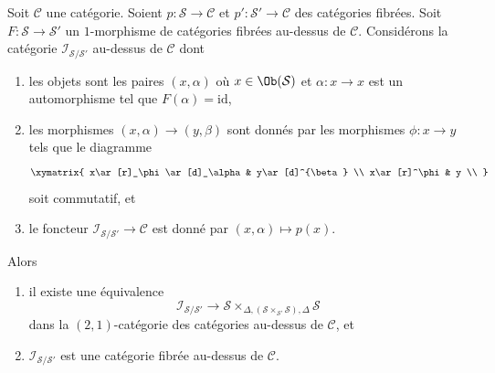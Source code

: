 \begin{lemma}
\label{lemma-inertia-fibred-category}
Soit $\mathcal{C}$ une catégorie. Soient
$p : \mathcal{S} \to \mathcal{C}$ et
$p' : \mathcal{S}' \to \mathcal{C}$ des catégories fibrées.
Soit $F : \mathcal{S} \to \mathcal{S}'$ un $1$-morphisme de
catégories fibrées au-dessus de $\mathcal{C}$. Considérons la catégorie
$\mathcal{I}_{\mathcal{S}/\mathcal{S}'}$ au-dessus de $\mathcal{C}$ dont
\begin{enumerate}
\item les objets sont les paires $(x, \alpha)$ où $x \in \Ob(\mathcal{S})$
et $\alpha : x \to x$ est un automorphisme tel que $F(\alpha) = \text{id}$,
\item les morphismes $(x, \alpha) \to (y, \beta)$ sont donnés par les morphismes
$\phi : x \to y$ tels que le diagramme
$$
\xymatrix{
x\ar[r]_\phi\ar[d]_\alpha &
y\ar[d]^{\beta} \\
x\ar[r]^\phi &
y \\
}
$$
soit commutatif, et
\item le foncteur $\mathcal{I}_{\mathcal{S}/\mathcal{S}'} \to \mathcal{C}$
est donné par $(x, \alpha) \mapsto p(x)$.
\end{enumerate}
Alors
\begin{enumerate}
\item il existe une équivalence
$$
\mathcal{I}_{\mathcal{S}/\mathcal{S}'} \longrightarrow
\mathcal{S}
\times_{\Delta, (\mathcal{S} \times_{\mathcal{S}'} \mathcal{S}), \Delta}
\mathcal{S}
$$
dans la $(2, 1)$-catégorie des catégories au-dessus de $\mathcal{C}$, et
\item $\mathcal{I}_{\mathcal{S}/\mathcal{S}'}$ est une catégorie fibrée au-dessus de
$\mathcal{C}$.
\end{enumerate}
\end{lemma}
